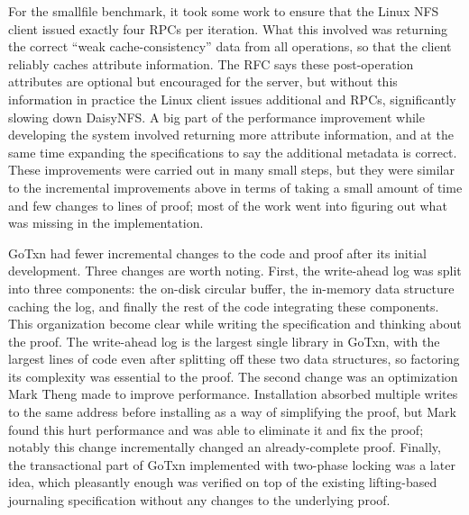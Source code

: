 For the smallfile benchmark, it took some work to ensure that the Linux NFS
client issued exactly four RPCs per iteration. What this involved was returning
the correct ``weak cache-consistency'' data from all operations, so that the
client reliably caches attribute information. The RFC says these post-operation
attributes are optional but encouraged for the server, but without this
information in practice the Linux client issues additional  and
 RPCs, significantly slowing down DaisyNFS. A big part of the
performance improvement while developing the system involved returning more
attribute information, and at the same time expanding the specifications to say
the additional metadata is correct. These improvements were carried out in many
small steps, but they were similar to the incremental improvements above in
terms of taking a small amount of time and few changes to lines of proof; most
of the work went into figuring out what was missing in the implementation.

GoTxn had fewer incremental changes to the code and proof after its initial
development. Three changes are worth noting. First, the write-ahead log was
split into three components: the on-disk circular buffer, the in-memory data
structure caching the log, and finally the rest of the code integrating these
components. This organization become clear while writing the specification and
thinking about the proof. The write-ahead log is the largest single library in
GoTxn, with the largest lines of code even after splitting off these two data
structures, so factoring its complexity was essential to the proof. The second
change was an optimization Mark Theng made to improve performance. Installation
absorbed multiple writes to the same address before installing as a way of
simplifying the proof, but Mark found this hurt performance and was able to
eliminate it and fix the proof; notably this change incrementally changed an
already-complete proof. Finally, the transactional part of GoTxn implemented
with two-phase locking was a later idea,
which pleasantly enough was verified on top of the existing lifting-based
journaling specification without any changes to the underlying proof.


